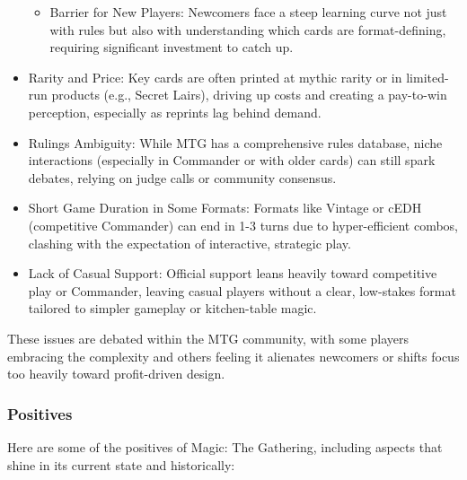 \begin{itemize}
\begin{itemize}
		\item Barrier for New Players: Newcomers face a steep learning curve not just with rules but also with understanding which cards are format-defining, requiring significant investment to catch up.
	\end{itemize}
\item Rarity and Price: Key cards are often printed at mythic rarity or in limited-run products (e.g., Secret Lairs), driving up costs and creating a pay-to-win perception, especially as reprints lag behind demand.
\item Rulings Ambiguity: While MTG has a comprehensive rules database, niche interactions (especially in Commander or with older cards) can still spark debates, relying on judge calls or community consensus.
\item Short Game Duration in Some Formats: Formats like Vintage or cEDH (competitive Commander) can end in 1-3 turns due to hyper-efficient combos, clashing with the expectation of interactive, strategic play.
\item Lack of Casual Support: Official support leans heavily toward competitive play or Commander, leaving casual players without a clear, low-stakes format tailored to simpler gameplay or kitchen-table magic.
\end{itemize}

These issues are debated within the MTG community, with some players embracing the complexity and others feeling it alienates newcomers or shifts focus too heavily toward profit-driven design.

\subsubsection{Positives}

Here are some of the positives of Magic: The Gathering, including aspects that shine in its current state and historically:

